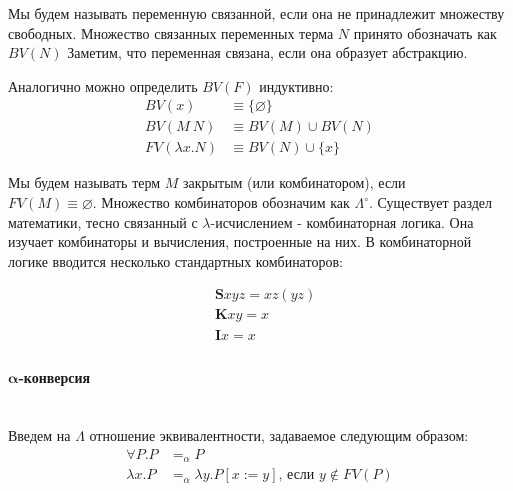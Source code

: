 \documentclass[lambda.tex]{subfiles}
\begin{document}
Мы будем называть переменную связанной, если она не принадлежит множеству свободных. Множество связанных переменных терма $N$ принято обозначать как $BV(N)$ Заметим, что переменная связана, если она образует абстракцию.

Аналогично можно определить $BV(F)$ индуктивно:
\begin{align*}
	BV(x) 			&\equiv \{\varnothing\}\\
	BV(M\ N) 		&\equiv BV(M)\cup BV(N)\\
	FV(\lambda x.N) &\equiv BV(N)\cup\{x\}
\end{align*}

Мы будем называть терм $M$ закрытым (или комбинатором), если\\ \(FV(M) \equiv \varnothing\). Множество комбинаторов обозначим как $\Lambda^\circ$. Существует раздел математики, тесно связанный с $\lambda$-исчислением - комбинаторная логика. Она изучает комбинаторы и вычисления, построенные на них. В комбинаторной логике вводится несколько стандартных комбинаторов:

\begin{align*}
	&\boldsymbol{S}xyz = xz(yz)\\
	&\boldsymbol{K}xy = x\\
    &\boldsymbol{I}x = x\\
\end{align*}


\newpage
\paragraph{$\boldsymbol{\alpha}$-конверсия} %
\label{par:aplha conversion} ~\\

Введем на $\Lambda$ отношение эквивалентности, задаваемое следующим образом:
\begin{align*}
	\forall P.P &=_\alpha P\\
	\lambda x.P &=_\alpha \lambda y.P[x:=y] \text{, если } y \not\in FV(P)
\end{align*}
\end{document}
